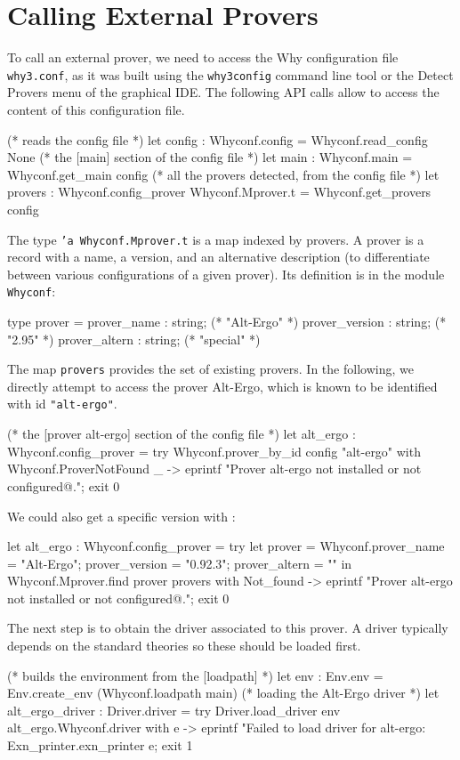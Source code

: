 \section{Calling External Provers}

To call an external prover, we need to access the Why configuration
file \texttt{why3.conf}, as it was built using the \texttt{why3config}
command line tool or the \textsf{Detect Provers} menu of the graphical
IDE. The following API calls allow to access the content of this
configuration file.
\begin{ocamlcode}
(* reads the config file *)
let config : Whyconf.config = Whyconf.read_config None
(* the [main] section of the config file *)
let main : Whyconf.main = Whyconf.get_main config
(* all the provers detected, from the config file *)
let provers : Whyconf.config_prover Whyconf.Mprover.t =
  Whyconf.get_provers config
\end{ocamlcode}
The type \texttt{'a Whyconf.Mprover.t} is a map indexed by provers. A
prover is a record with a name, a version, and an alternative description
(to differentiate between various configurations of a given prover). Its
definition is in the module \texttt{Whyconf}:
\begin{ocamlcode}
type prover =
    { prover_name : string; (* "Alt-Ergo" *)
      prover_version : string; (* "2.95" *)
      prover_altern : string; (* "special" *)
    }
\end{ocamlcode}
The map \texttt{provers} provides the set of existing provers.
In the following, we directly
attempt to access the prover Alt-Ergo, which is known to be identified
with id \texttt{"alt-ergo"}.
\begin{ocamlcode}
(* the [prover alt-ergo] section of the config file *)
let alt_ergo : Whyconf.config_prover =
  try
    Whyconf.prover_by_id config "alt-ergo"
  with Whyconf.ProverNotFound _ ->
    eprintf "Prover alt-ergo not installed or not configured@.";
    exit 0
\end{ocamlcode}
We could also get a specific version with :
\begin{ocamlcode}
let alt_ergo : Whyconf.config_prover =
  try
    let prover = {Whyconf.prover_name = "Alt-Ergo";
                  prover_version = "0.92.3";
                  prover_altern = ""} in
    Whyconf.Mprover.find prover provers
  with Not_found ->
    eprintf "Prover alt-ergo not installed or not configured@.";
    exit 0
\end{ocamlcode}

The next step is to obtain the driver associated to this prover. A
driver typically depends on the standard theories so these should be
loaded first.
\begin{ocamlcode}
(* builds the environment from the [loadpath] *)
let env : Env.env =
  Env.create_env (Whyconf.loadpath main)
(* loading the Alt-Ergo driver *)
let alt_ergo_driver : Driver.driver =
  try
    Driver.load_driver env alt_ergo.Whyconf.driver
  with e ->
    eprintf "Failed to load driver for alt-ergo: %
      Exn_printer.exn_printer e;
    exit 1
\end{ocamlcode}


